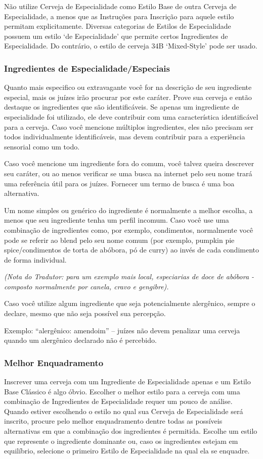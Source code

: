 Não utilize Cerveja de Especialidade como Estilo Base de outra Cerveja de Especialidade, a menos que as Instruções para Inscrição para aquele estilo permitam explicitamente. Diversas categorias de Estilos de Especialidade possuem um estilo ‘de Especialidade’ que permite certos Ingredientes de Especialidade. Do contrário, o estilo de cerveja 34B ‘Mixed-Style’ pode ser usado.

\subsubsection*{Ingredientes de Especialidade/Especiais}
Quanto mais especifico ou extravagante você for na descrição de seu ingrediente especial, mais os juízes irão procurar por este caráter. Prove sua cerveja e então destaque os ingredientes que são identificáveis. Se apenas um ingrediente de especialidade foi utilizado, ele deve contribuir com uma característica identificável para a cerveja. Caso você mencione múltiplos ingredientes, eles não precisam ser todos individualmente identificáveis, mas devem contribuir para a experiência sensorial como um todo.

Caso você mencione um ingrediente fora do comum, você talvez queira descrever seu caráter, ou ao menos verificar se uma busca na internet pelo seu nome trará uma referência útil para os juízes. Fornecer um termo de busca é uma boa alternativa.

Um nome simples ou genérico do ingrediente é normalmente a melhor escolha, a menos que seu ingrediente tenha um perfil incomum. Caso você use uma combinação de ingredientes como, por exemplo, condimentos, normalmente você pode se referir ao blend pelo seu nome comum (por exemplo, pumpkin pie spice/condimentos de torta de abóbora, pó de curry) ao invés de cada condimento de forma individual.

\textit{(Nota do Tradutor: para um exemplo mais local, especiarias de doce de abóbora - composto normalmente por canela, cravo e gengibre).}

Caso você utilize algum ingrediente que seja potencialmente alergênico, sempre o declare, mesmo que não seja possível sua percepção.

Exemplo: “alergênico: amendoim” – juízes não devem penalizar uma cerveja quando um alergênico declarado não é percebido.

\subsubsection*{Melhor Enquadramento}
Inscrever uma cerveja com um Ingrediente de Especialidade apenas e um Estilo Base Clássico é algo óbvio. Escolher o melhor estilo para a cerveja com uma combinação de Ingredientes de Especialidade requer um pouco de análise. Quando estiver escolhendo o estilo no qual sua Cerveja de Especialidade será inscrito, procure pelo melhor enquadramento dentre todas as possíveis alternativas em que a combinação dos ingredientes é permitida. Escolhe um estilo que represente o ingrediente dominante ou, caso os ingredientes estejam em equilíbrio, selecione o primeiro Estilo de Especialidade na qual ela se enquadre.

